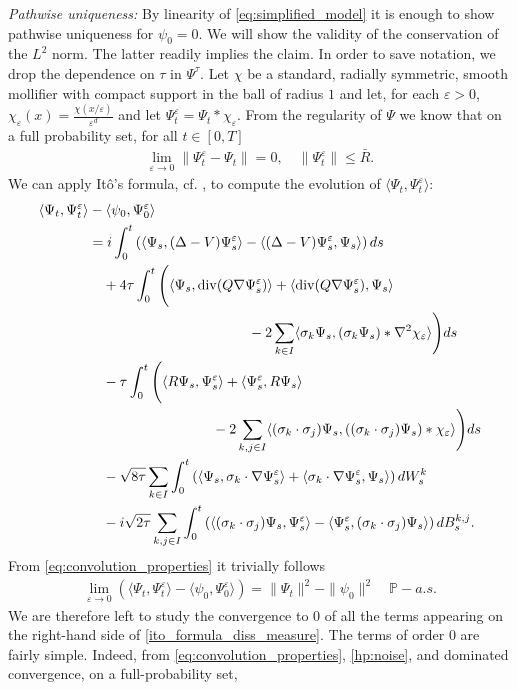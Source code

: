 \documentclass[a4paper,10pt]{amsart}
\renewcommand{\epsilon}{\varepsilon}
\theoremstyle{remark}
\numberwithin{equation}{section}
\begin{document}
\emph{Pathwise uniqueness:} By linearity of \eqref{eq:simplified_model} it is enough to show pathwise uniqueness for $\psi_0=0$. We will show the validity of the conservation of the $L^2$ norm. The latter readily implies the claim. In order to save notation, we drop the dependence on $\tau$ in $\Psi^\tau$. Let $\chi$ be a standard, radially symmetric, smooth mollifier with compact support in the ball of radius $1$ and let, for each $\epsilon>0$, $\chi_{\epsilon}(x)=\frac{\chi(x/\epsilon)}{\epsilon^d}$ and let
 $\Psi^{\epsilon}_t=\Psi_t\ast \chi_{\epsilon}$. From the regularity of $\Psi$ we know that on a full probability set, for all $t\in [0,T]$
 \begin{align}\label{eq:convolution_properties}
     \lim_{\epsilon\rightarrow0}\|\Psi^{\epsilon}_t-\Psi_t\|=0,\quad \|\Psi^{\epsilon}_t\|\leq \bar{R}.
 \end{align}
 We can apply It\^o's formula, cf. \cite[Theorem 4.32]{da2014stochastic}, to compute the evolution of $\langle\Psi_t,\Psi^{\epsilon}_t\rangle $:
\begin{align}\label{ito_formula_diss_measure}
\langle\Psi_t,\Psi^{\epsilon}_t\rangle
&-\langle\psi_0,\Psi^{\epsilon}_0\rangle\\
&=i\int_0^t\left(
\langle \Psi_s,(\Delta-V)\Psi^{\epsilon}_s\rangle
-\langle(\Delta-V)\Psi^{\epsilon}_s,\Psi_s\rangle\right)ds\notag\\
&\quad+4\tau\int_0^t\Bigg(
\langle \Psi_s,\operatorname{div}(Q\nabla\Psi^{\epsilon}_s)\rangle
+\langle \operatorname{div}(Q\nabla\Psi^{\epsilon}_s),\Psi_s\rangle\notag\\
&\hspace{40mm}
-2\sum_{k\in I}\langle \sigma_k\Psi_s,
(\sigma_k\Psi_s)\ast\nabla^2\chi_{\epsilon}\rangle
\Bigg)ds\notag\\
&\quad-\tau\int_0^t\Bigg(
\langle R\Psi_s,\Psi^{\epsilon}_s\rangle
+\langle \Psi^{\epsilon}_s,R\Psi_s\rangle\notag\\
&\hspace{31mm}
-2\sum_{k,j\in I}\langle(\sigma_k\cdot\sigma_j)\Psi_s,
((\sigma_k\cdot\sigma_j)\Psi_s)\ast\chi_{\epsilon}\rangle
\Bigg)ds\notag\\
&\quad-\sqrt{8\tau}\sum_{k\in I}\int_0^t\left(
\langle \Psi_s,\sigma_k\cdot\nabla\Psi^{\epsilon}_s\rangle
+\langle\sigma_k\cdot\nabla\Psi^{\epsilon}_s,\Psi_s\rangle
\right)dW^k_s\notag\\
&\quad-i\sqrt{2\tau}\sum_{k,j\in I}\int_0^t\left(
\langle(\sigma_k\cdot\sigma_j)\Psi_s,\Psi^{\epsilon}_s\rangle
-\langle\Psi^{\epsilon}_s,(\sigma_k\cdot\sigma_j)\Psi_s\rangle
\right)dB^{k,j}_s.
\end{align}
From \eqref{eq:convolution_properties} it trivially follows 
\begin{align*}
    \lim_{\epsilon\rightarrow 0}\left(
    \langle\Psi_t,\Psi^{\epsilon}_t\rangle
    -\langle\psi_0,\Psi^{\epsilon}_0\rangle\right)
    =\|\Psi_t\|^2-\|\psi_0\|^2\quad \mathbb{P}-a.s.
\end{align*}
We are therefore left to study the convergence to $0$ of all the terms
appearing on the right-hand side of \eqref{ito_formula_diss_measure}. The
terms of order $0$ are fairly simple. Indeed, from
\eqref{eq:convolution_properties}, \cref{hp:noise}, and dominated
convergence, on a full-probability set,
\end{document}
